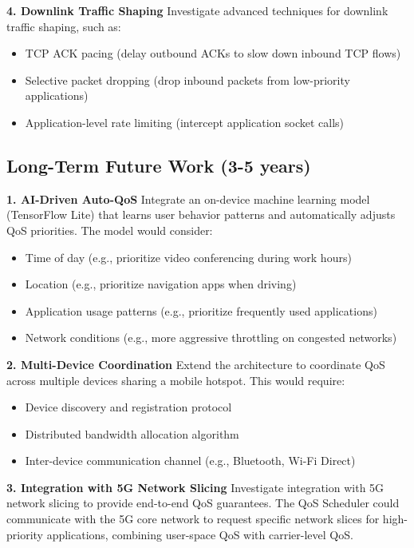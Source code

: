 \textbf{4. Downlink Traffic Shaping}
Investigate advanced techniques for downlink traffic shaping, such as:
\begin{itemize}
    \item TCP ACK pacing (delay outbound ACKs to slow down inbound TCP flows)
    \item Selective packet dropping (drop inbound packets from low-priority applications)
    \item Application-level rate limiting (intercept application socket calls)
\end{itemize}

\subsection{Long-Term Future Work (3-5 years)}

\textbf{1. AI-Driven Auto-QoS}
Integrate an on-device machine learning model (TensorFlow Lite) that learns user behavior patterns and automatically adjusts QoS priorities. The model would consider:
\begin{itemize}
    \item Time of day (e.g., prioritize video conferencing during work hours)
    \item Location (e.g., prioritize navigation apps when driving)
    \item Application usage patterns (e.g., prioritize frequently used applications)
    \item Network conditions (e.g., more aggressive throttling on congested networks)
\end{itemize}

\textbf{2. Multi-Device Coordination}
Extend the architecture to coordinate QoS across multiple devices sharing a mobile hotspot. This would require:
\begin{itemize}
    \item Device discovery and registration protocol
    \item Distributed bandwidth allocation algorithm
    \item Inter-device communication channel (e.g., Bluetooth, Wi-Fi Direct)
\end{itemize}

\textbf{3. Integration with 5G Network Slicing}
Investigate integration with 5G network slicing to provide end-to-end QoS guarantees. The QoS Scheduler could communicate with the 5G core network to request specific network slices for high-priority applications, combining user-space QoS with carrier-level QoS.

